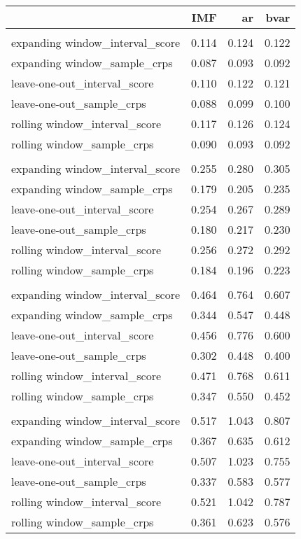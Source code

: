 \documentclass[
]{article}
\begin{document}
\newpage
\begin{longtable}{l|rrr}
\toprule
\multicolumn{1}{l}{} & IMF & ar & bvar \\ 
\midrule\addlinespace[2.5pt]
\multicolumn{4}{l}{horizon = 0} \\ 
\midrule\addlinespace[2.5pt]
expanding window\_interval\_score & 0.114 & 0.124 & 0.122 \\ 
expanding window\_sample\_crps & 0.087 & 0.093 & 0.092 \\ 
leave-one-out\_interval\_score & 0.110 & 0.122 & 0.121 \\ 
leave-one-out\_sample\_crps & 0.088 & 0.099 & 0.100 \\ 
rolling window\_interval\_score & 0.117 & 0.126 & 0.124 \\ 
rolling window\_sample\_crps & 0.090 & 0.093 & 0.092 \\ 
\midrule\addlinespace[2.5pt]
\multicolumn{4}{l}{horizon = 0.5} \\ 
\midrule\addlinespace[2.5pt]
expanding window\_interval\_score & 0.255 & 0.280 & 0.305 \\ 
expanding window\_sample\_crps & 0.179 & 0.205 & 0.235 \\ 
leave-one-out\_interval\_score & 0.254 & 0.267 & 0.289 \\ 
leave-one-out\_sample\_crps & 0.180 & 0.217 & 0.230 \\ 
rolling window\_interval\_score & 0.256 & 0.272 & 0.292 \\ 
rolling window\_sample\_crps & 0.184 & 0.196 & 0.223 \\ 
\midrule\addlinespace[2.5pt]
\multicolumn{4}{l}{horizon = 1} \\ 
\midrule\addlinespace[2.5pt]
expanding window\_interval\_score & 0.464 & 0.764 & 0.607 \\ 
expanding window\_sample\_crps & 0.344 & 0.547 & 0.448 \\ 
leave-one-out\_interval\_score & 0.456 & 0.776 & 0.600 \\ 
leave-one-out\_sample\_crps & 0.302 & 0.448 & 0.400 \\ 
rolling window\_interval\_score & 0.471 & 0.768 & 0.611 \\ 
rolling window\_sample\_crps & 0.347 & 0.550 & 0.452 \\ 
\midrule\addlinespace[2.5pt]
\multicolumn{4}{l}{horizon = 1.5} \\ 
\midrule\addlinespace[2.5pt]
expanding window\_interval\_score & 0.517 & 1.043 & 0.807 \\ 
expanding window\_sample\_crps & 0.367 & 0.635 & 0.612 \\ 
leave-one-out\_interval\_score & 0.507 & 1.023 & 0.755 \\ 
leave-one-out\_sample\_crps & 0.337 & 0.583 & 0.577 \\ 
rolling window\_interval\_score & 0.521 & 1.042 & 0.787 \\ 
rolling window\_sample\_crps & 0.361 & 0.623 & 0.576 \\ 
\bottomrule
\end{longtable}
\end{document}
